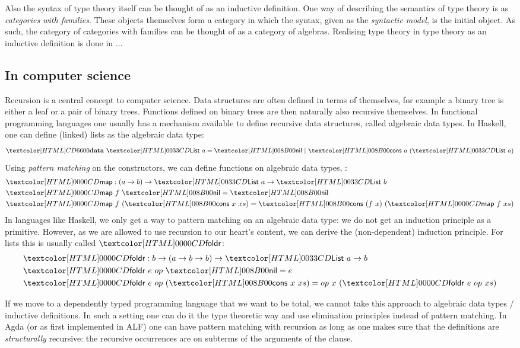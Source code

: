 Also the syntax of type theory itself can be thought of as an
inductive definition. One way of describing the semantics of type
theory is as \emph{categories with families}. These objects themselves
form a category in which the syntax, given as the \emph{syntactic
  model}, is the initial object. As such, the category of categories
with families can be thought of as a category of algebras. Realising
type theory in type theory as an inductive definition is done in ...

\subsection{In computer science}

Recursion is a central concept to computer science. Data structures
are often defined in terms of themselves, for example a binary tree is
either a leaf or a pair of binary trees. Functions defined on binary
trees are then naturally also recursive themselves. In functional
programming languages one usually has a mechanism available to define
recursive data structures, called algebraic data types. In Haskell,
one can define (linked) lists as the algebraic data type:
$$
\data\ \List\ a = \listnil\ |\ \listcons\ a\ (\List\ a)
$$
Using \emph{pattern matching} on the constructors, we can define
functions on algebraic data types, \eg:
\begin{align*}
  &\listmap : (a \to b) \to \List\ a \to \List\ b \\
  &\listmap\ f\ \listnil = \listnil \\
  &\listmap\ f\ (\listcons\ x\ xs) = \listcons\ (f\ x)\ (\listmap\ f\ xs)
\end{align*}
In languages like Haskell, we only get a way to pattern matching on an
algebraic data type: we do not get an induction principle as a
primitive. However, as we are allowed to use recursion to our heart's
content, we can derive the (non-dependent) induction principle. For
lists this is usually called $\listfoldr$:
\begin{align*}
  &\listfoldr : b \to (a \to b \to b) \to \List\ a \to b \\
  &\listfoldr\ e\ op\ \listnil = e \\
  &\listfoldr\ e\ op\ (\listcons\ x\ xs) = op\ x\ (\listfoldr\ e\ op\ xs)
\end{align*}

If we move to a dependently typed programming language that we want to
be total, we cannot take this approach to algebraic data types /
inductive definitions. In such a setting one can do it the type
theoretic way and use elimination principles instead of pattern
matching.  In Agda (or as first implemented in ALF) one can have
pattern matching with recursion as long as one makes sure that the
definitions are \emph{structurally} recursive: the recursive
occurrences are on subterms of the arguments of the clause.

